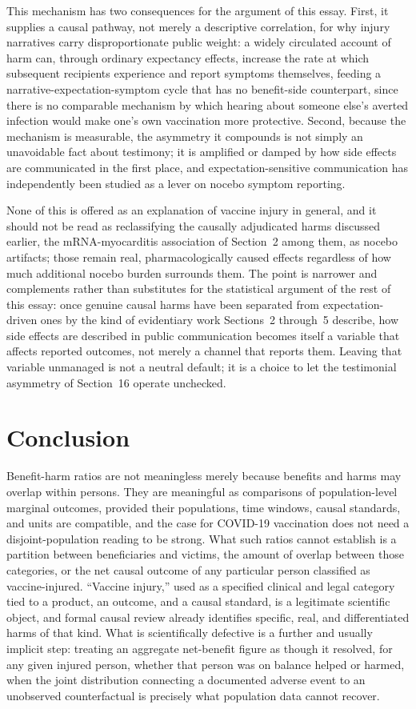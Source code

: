 \documentclass[11pt]{article}
\begin{document}
This mechanism has two consequences for the argument of this essay. First, it supplies a causal pathway, not merely a descriptive correlation, for why injury narratives carry disproportionate public weight: a widely circulated account of harm can, through ordinary expectancy effects, increase the rate at which subsequent recipients experience and report symptoms themselves, feeding a narrative-expectation-symptom cycle that has no benefit-side counterpart, since there is no comparable mechanism by which hearing about someone else's averted infection would make one's own vaccination more protective. Second, because the mechanism is measurable, the asymmetry it compounds is not simply an unavoidable fact about testimony; it is amplified or damped by how side effects are communicated in the first place, and expectation-sensitive communication has independently been studied as a lever on nocebo symptom reporting.

None of this is offered as an explanation of vaccine injury in general, and it should not be read as reclassifying the causally adjudicated harms discussed earlier, the mRNA-myocarditis association of Section~2 among them, as nocebo artifacts; those remain real, pharmacologically caused effects regardless of how much additional nocebo burden surrounds them. The point is narrower and complements rather than substitutes for the statistical argument of the rest of this essay: once genuine causal harms have been separated from expectation-driven ones by the kind of evidentiary work Sections~2 through~5 describe, how side effects are described in public communication becomes itself a variable that affects reported outcomes, not merely a channel that reports them. Leaving that variable unmanaged is not a neutral default; it is a choice to let the testimonial asymmetry of Section~16 operate unchecked.

\section{Conclusion}

Benefit-harm ratios are not meaningless merely because benefits and harms may overlap within persons. They are meaningful as comparisons of population-level marginal outcomes, provided their populations, time windows, causal standards, and units are compatible, and the case for COVID-19 vaccination does not need a disjoint-population reading to be strong. What such ratios cannot establish is a partition between beneficiaries and victims, the amount of overlap between those categories, or the net causal outcome of any particular person classified as vaccine-injured. ``Vaccine injury,'' used as a specified clinical and legal category tied to a product, an outcome, and a causal standard, is a legitimate scientific object, and formal causal review already identifies specific, real, and differentiated harms of that kind. What is scientifically defective is a further and usually implicit step: treating an aggregate net-benefit figure as though it resolved, for any given injured person, whether that person was on balance helped or harmed, when the joint distribution connecting a documented adverse event to an unobserved counterfactual is precisely what population data cannot recover.
\end{document}
